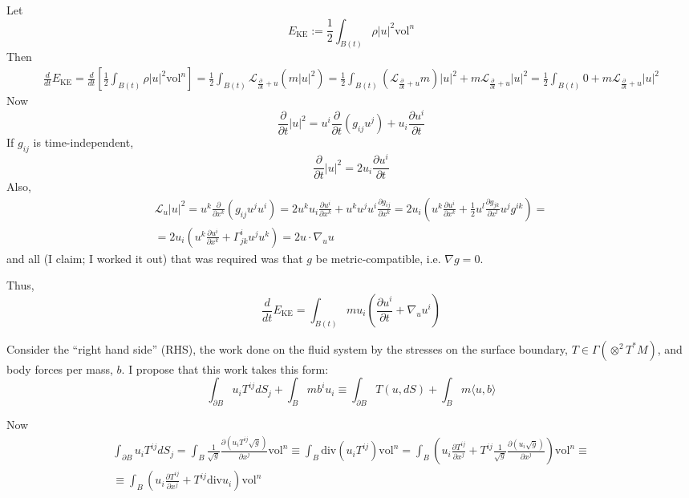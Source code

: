 \documentclass[twoside,landscape,10pt]{amsart}
\theoremstyle{plain}
\theoremstyle{definition}
\theoremstyle{remark}
\theoremstyle{remark}
\begin{document}
\begin{multicols*}{2}
Let 
\[
E_{\text{KE}} := \frac{1}{2} \int_{B(t)} \rho |u|^2 \text{vol}^n
\]
Then
\[
\begin{gathered}
  \frac{d}{dt} E_{\text{KE}} = \frac{d}{dt} \left[ \frac{1}{2} \int_{B(t)} \rho |u|^2 \text{vol}^n \right] = \frac{1}{2} \int_{B(t)} \mathcal{L}_{\frac{\partial}{\partial t} + u }( m|u|^2) = \frac{1}{2} \int_{B(t)} ( \mathcal{L}_{\frac{\partial }{ \partial t} + u } m ) |u|^2 + m \mathcal{L}_{\frac{ \partial }{ \partial t} + u } |u|^2  = \frac{1}{2} \int_{B(t)} 0 + m \mathcal{L}_{\frac{\partial}{\partial t} +u } |u|^2 
\end{gathered}
\]
Now
\[
\frac{\partial}{\partial t} |u|^2  = u^i \frac{\partial}{\partial t} (g_{ij} u^j ) + u_i \frac{\partial u^i}{ \partial t} 
\]
If $g_{ij}$ is time-independent, 
\[
\frac{\partial }{ \partial t} |u|^2 = 2u_i \frac{\partial u^i}{\partial t}
\]
Also,
\[
\begin{gathered}
  \mathcal{L}_u |u|^2  = u^k \frac{\partial }{ \partial x^k} (g_{ij} u^j u^i) = 2u^k u_i \frac{\partial u^i}{ \partial x^k} + u^k u^j u^i \frac{ \partial g_{ij} }{ \partial x^k} = 2u_i ( u^k \frac{ \partial u^i }{ \partial x^k} + \frac{1}{2}u^l \frac{ \partial g_{jk}}{ \partial x^l} u^j g^{ik} ) = \\
  = 2u_i \left( u^k \frac{ \partial u^i}{ \partial x^k} + \Gamma^i_{jk} u^j u^k \right) = 2u \cdot \nabla_u u
\end{gathered}
\]
and all (I claim; I worked it out) that was required was that $g$ be metric-compatible, i.e. $\nabla g=0$.  

Thus,
\[
\frac{d}{dt} E_{\text{KE}} =  \int_{B(t)} m u_i \left(  \frac{ \partial u^i }{ \partial t} + \nabla_u u^i \right)
\]

Consider the ``right hand side'' (RHS), the work done on the fluid system by the stresses on the surface boundary, $T \in \Gamma( \otimes^2 T^*M)$, and body forces per mass, $b$.  I propose that this work takes this form:
\begin{equation}
  \int_{\partial B} u_i T^{ij} dS_j + \int_B m b^i u_i \equiv \int_{\partial B} T(u,dS) + \int_B m \langle u,b \rangle
\end{equation}

Now
\[
\begin{gathered}
\int_{\partial B} u_i T^{ij} dS_j = \int_B \frac{1}{\sqrt{g}} \frac{ \partial ( u_i T^{ij} \sqrt{g})}{ \partial x^j} \text{vol}^n \equiv \int_B \text{div}(u_i T^{ij}) \text{vol}^n = \int_B \left( u_i \frac{ \partial T^{ij}}{ \partial x^j} + T^{ij} \frac{1}{\sqrt{g}} \frac{ \partial (u_i \sqrt{g})}{ \partial x^j} \right) \text{vol}^n \equiv \\
\equiv \int_B \left( u_i \frac{ \partial T^{ij}}{ \partial x^j} + T^{ij} \text{div}u_i \right)\text{vol}^n
\end{gathered}
\]


\end{multicols*}
\end{document}
